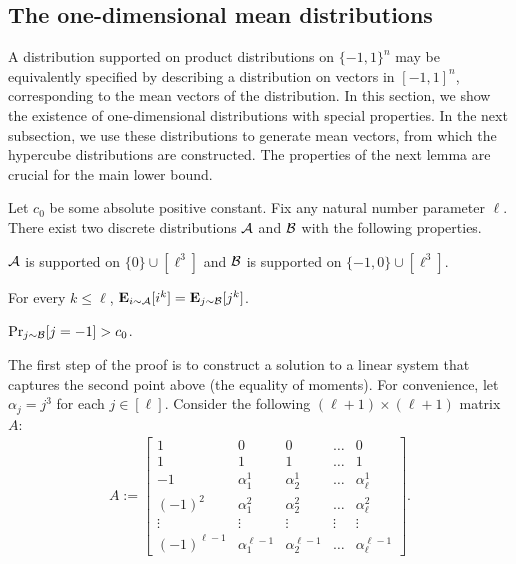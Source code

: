 \subsection{The one-dimensional mean distributions} \label{sec:mean-dist}

A distribution supported on product distributions on $\{-1,1\}^n$ may be equivalently specified by describing a distribution on vectors in $[-1,1]^n$, corresponding to the mean vectors of the distribution. 
In this section, we show the existence of one-dimensional distributions with special properties. In the next subsection, we use these
distributions to generate mean vectors, from which the hypercube distributions are constructed. The properties of the next
lemma are crucial for the main lower bound.

\begin{lemma}\label{lem:one-dim-dist}
Let $c_0$ be some absolute positive constant.
Fix any natural number parameter $\ell$. There exist two discrete distributions ${\cal A}$ and $\mathcal{B}$ with the following properties.
\begin{asparaitem}
	\item ${\cal A}$ is supported on $\{0\} \cup [\ell^3]$ and $\mathcal{B}$ is supported on $\{-1, 0\} \cup [\ell^3]$.
	\item For every $k \leq \ell$, $\hbox{\bf E}_{i \sim {\cal A}}[i^k] = \hbox{\bf E}_{j \sim \mathcal{B}}[j^k]$.
	\item $\Pr_{j \sim \mathcal{B}}[j = -1] > c_0$.
\end{asparaitem}
\end{lemma}

The first step of the proof is to construct a solution to a linear system that captures the second point above (the equality of moments).
For convenience, let $\alpha_j= j^3$ for each $j\in [\ell]$.
Consider the following $(\ell+1) \times (\ell+1)$ matrix $A$:
\begin{align*}
A := \left[ \begin{array}{ccccc} 1 & 0 & 0 & \dots & 0 \\ 
				       1 & 1 & 1 & \dots & 1 \\
				       -1 & \alpha_1^1 & \alpha_2^1 & \dots & \alpha_{\ell}^1 \\
				       (-1)^2 & \alpha_1^2 & \alpha_2^2 & \dots & \alpha_{\ell}^2 \\
				       \vdots & \vdots & \vdots & \vdots & \vdots \\
				       (-1)^{\ell-1} & \alpha_1^{\ell-1} & \alpha_2^{\ell-1} & \dots & \alpha_{\ell}^{\ell-1} \end{array} \right].
\end{align*}

